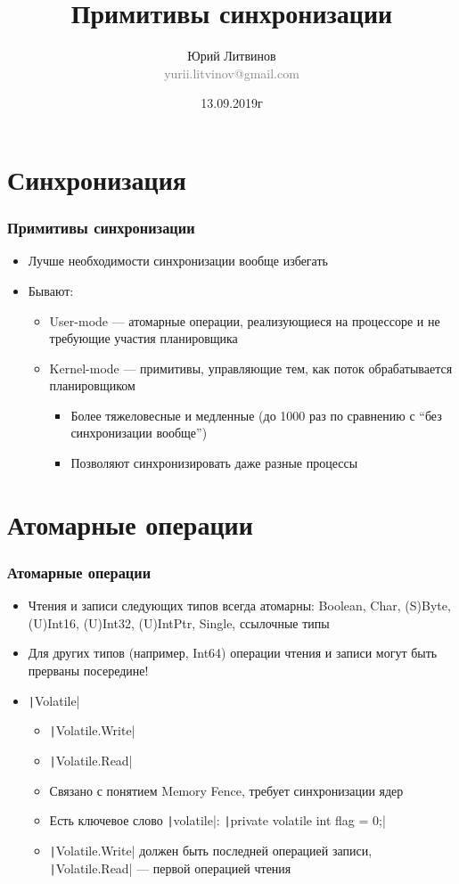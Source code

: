 \documentclass[xetex,mathserif,serif]{beamer}
\title{Примитивы синхронизации}
\author[Юрий Литвинов]{Юрий Литвинов\\\small{\textcolor{gray}{yurii.litvinov@gmail.com}}}
\date{13.09.2019г}
\begin{document}
	\frame{\titlepage}

	\section{Синхронизация}

	\begin{frame}
		\frametitle{Примитивы синхронизации}
		\begin{itemize}
			\item Лучше необходимости синхронизации вообще избегать
			\item Бывают:
			\begin{itemize}
				\item User-mode --- атомарные операции, реализующиеся на процессоре и не требующие участия планировщика
				\item Kernel-mode --- примитивы, управляющие тем, как поток обрабатывается планировщиком
				\begin{itemize}
					\item Более тяжеловесные и медленные (до 1000 раз по сравнению с ``без синхронизации вообще'')
					\item Позволяют синхронизировать даже разные процессы
				\end{itemize}
			\end{itemize}
		\end{itemize}
	\end{frame}

	\section{Атомарные операции}

	\begin{frame}
		\frametitle{Атомарные операции}
		\begin{itemize}
			\item Чтения и записи следующих типов всегда атомарны: Boolean, Char, (S)Byte, (U)Int16, (U)Int32, (U)IntPtr, Single, ссылочные типы
			\item Для других типов (например, Int64) операции чтения и записи могут быть прерваны посередине!
			\item \texttt|Volatile|
			\begin{itemize}
				\item \texttt|Volatile.Write|
				\item \texttt|Volatile.Read|
				\item Связано с понятием Memory Fence, требует синхронизации ядер
				\item Есть ключевое слово \texttt|volatile|: \texttt|private volatile int flag = 0;|
				\item \texttt|Volatile.Write| должен быть последней операцией записи, \texttt|Volatile.Read| --- первой операцией чтения
			\end{itemize}
		\end{itemize}
	\end{frame}
\end{document}
